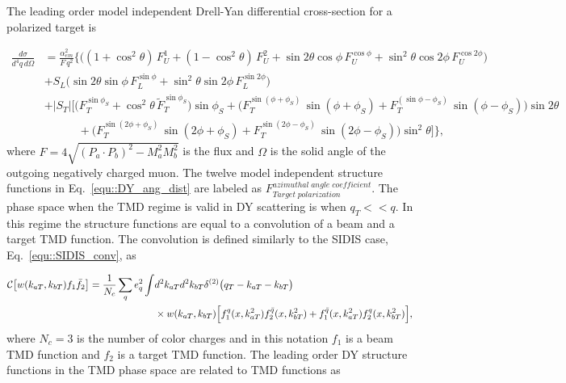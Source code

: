 The leading order model independent Drell-Yan differential cross-section for a
polarized target is~\cite{DYxSection,AKotzininaNote}

\begin{align} \label{equ::DY_ang_dist}
  \frac{d\sigma}{d^4 q \, d \Omega} &=
  \frac{\alpha_{em}^2}{F \, q^2}
  \Big \{ \Big(
   (1 + \cos^2 \theta) \, F_{U}^{1} 
 + (1 - \cos^2 \theta) \, F_{U}^{2} 
 + \sin 2\theta \cos \phi \, F_{U}^{\cos \phi} 
 + \sin^2 \theta \cos 2\phi \, F_{U}^{\cos 2\phi} \Big)
 \nonumber \\
 &+ S_{L} \Big( 
   \sin 2\theta \sin \phi \, F_{L}^{\sin \phi} 
   + \sin^2 \theta \sin 2\phi \, F_{L}^{\sin 2\phi} \Big)
   \nonumber \\
   &+ |S_{T}|
   \Big[ \Big(
     F_{T}^{\sin \phi_S} + \cos^2 \theta \, \tilde{F}_{T}^{\sin \phi_S}
     \Big)\sin \phi_{S} 
     + \Big( F_{T}^{\sin (\phi +\phi_S)} \, \sin(\phi+\phi_S) +
     F_{T}^{(\sin \phi - \phi_S)}\, \sin(\phi-\phi_S) \Big)\sin 2\theta
     \nonumber \\
     & \quad\quad\quad +
     \Big( F_{T}^{\sin (2\phi +\phi_S)}\, \sin(2\phi+\phi_S) +
     F_{T}^{\sin (2\phi - \phi_S)}\, \sin(2\phi-\phi_S) \Big)\sin ^2\theta
     \Big ]
   \Big \},
\end{align}
\noindent
where $F = 4\sqrt{(P_a \cdot P_b)^2 - M_a^2M_b^2}$ is the flux and $\Omega$ is
the solid angle of the outgoing negatively charged muon.  The twelve model
independent structure functions in Eq.~\ref{equ::DY_ang_dist} are labeled as
$F_{Target \; polarization}^{azimuthal \;angle\;coefficient}$.  The phase space
when the TMD regime is valid in DY scattering is when $q_T << q$.  In this
regime the structure functions are equal to a convolution of a beam and a target
TMD function.  The convolution is defined similarly to the SIDIS case,
Eq.~\ref{equ::SIDIS_conv}, as

\begin{align}
  \label{equ::DY_conv}
  \nonumber
      {\cal C}\bigl[ w(k_{aT}, k_{bT}) f_1 \bar{f}_2 \bigr] =
      \frac{1}{N_c} \sum_q e_q^2 \int &d^2 k_{aT} d^2 k_{bT} 
      \delta^{(2)}\bigl(q_T - k_{aT} - k_{bT} \bigr) \\
      &\times w(k_{aT},k_{bT})
        \Big[ f_1^q(x,k_{aT}^2)f_2^{\bar{q}}(x,k_{bT}^2) +
          f_1^{\bar{q}}(x,k_{aT}^2)f_2^{q}(x,k_{bT}^2) \Big],
\end{align}
\noindent
where $N_c = 3$ is the number of color charges and in this notation $f_1$ is a
beam TMD function and $f_2$ is a target TMD function.  The leading order DY
structure functions in the TMD phase space are related to TMD functions
as~\cite{DYxSection}

